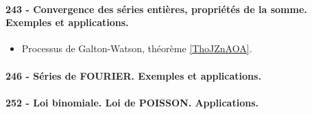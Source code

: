 \paragraph{243 - Convergence des séries entières, propriétés de la somme. Exemples et applications.}
\begin{itemize}
    \item Processus de Galton-Watson, théorème \ref{ThoJZnAOA}.
\end{itemize}

\paragraph{246 - Séries de FOURIER. Exemples et applications.}
\paragraph{252 - Loi binomiale. Loi de POISSON. Applications.}


